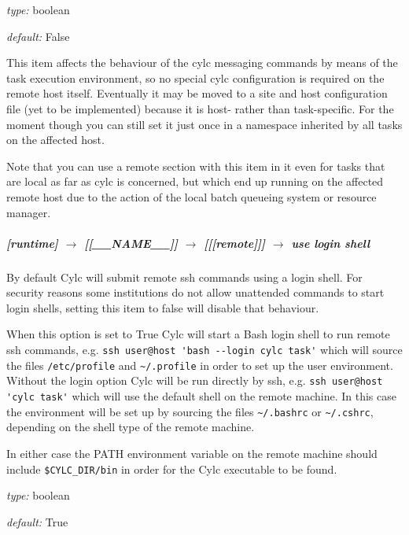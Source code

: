 \begin{myitemize}
\item {\em type:} boolean
\item {\em default:} False
\end{myitemize}

This item affects the behaviour of the cylc messaging commands by means
of the task execution environment, so no special cylc configuration is
required on the remote host itself. Eventually it may be moved to a site
and host configuration file (yet to be implemented) because it is host-
rather than task-specific. For the moment though you can still set it
just once in a namespace inherited by all tasks on the affected host.

Note that you can use a remote section with this item in it even for
tasks that are local as far as cylc is concerned, but which end up
running on the affected remote host due to the action of the local batch
queueing system or resource manager.


\subparagraph[ssh messaging]{[runtime] $\rightarrow$ [[\_\_NAME\_\_]] $\rightarrow$ [[[remote]]] $\rightarrow$ use login shell}

By default Cylc will submit remote ssh commands using a login shell. For
security reasons some institutions do not allow unattended commands to start
login shells, setting this item to false will disable that behaviour.

When this option is set to True Cylc will start a Bash login shell to run
remote ssh commands, e.g. \lstinline=ssh user@host 'bash --login cylc task'=
which will source the files \lstinline=/etc/profile= and \lstinline=~/.profile=
in order to set up the user environment. Without the login option Cylc will be
run directly by ssh, e.g. \lstinline=ssh user@host 'cylc task'= which will use
the default shell on the remote machine. In this case the environment will be
set up by sourcing the files \lstinline=~/.bashrc= or \lstinline=~/.cshrc=,
depending on the shell type of the remote machine.

In either case the PATH environment variable on the remote machine should
include \lstinline=$CYLC_DIR/bin= in order for the Cylc executable to be
found.

\begin{myitemize}
\item {\em type:} boolean
\item {\em default:} True
\end{myitemize}

